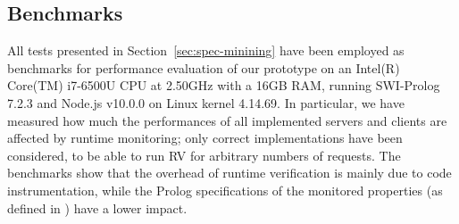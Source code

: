 \subsection{Benchmarks}

All tests presented in Section~\ref{sec:spec-minining} have been employed as benchmarks for performance evaluation
of our prototype on an Intel(R) Core(TM) i7-6500U CPU at 2.50GHz with a 16GB RAM, running SWI-Prolog 7.2.3 and Node.js v10.0.0 on
Linux kernel 4.14.69.
In particular, we have measured how much the performances of all implemented servers and clients are affected by runtime monitoring;
only correct implementations have been considered, to be able to run RV for arbitrary numbers of requests.
The benchmarks show that the overhead of runtime verification is mainly due to code instrumentation, while the Prolog specifications of the monitored properties (as defined in ) have a lower impact.


